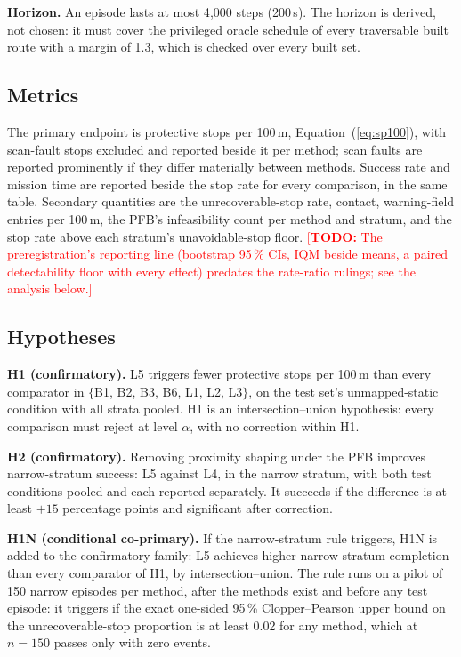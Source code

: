 \documentclass[sensors,article,submit,moreauthors]{Definitions/mdpi}
\newcommand{\todo}[1]{\textcolor{red}{[\textbf{TODO:} #1]}}
\begin{document}
\textbf{Horizon.} An episode lasts at most 4{,}000 steps (200\,s). The horizon is derived, not chosen: it must cover the privileged oracle schedule of every traversable built route with a margin of 1.3, which is checked over every built set.

\subsection{Metrics}\label{sec:metrics}

The primary endpoint is protective stops per 100\,m, Equation~(\ref{eq:sp100}), with scan-fault stops excluded and reported beside it per method; scan faults are reported prominently if they differ materially between methods. Success rate and mission time are reported beside the stop rate for every comparison, in the same table. Secondary quantities are the unrecoverable-stop rate, contact, warning-field entries per 100\,m, the PFB's infeasibility count per method and stratum, and the stop rate above each stratum's unavoidable-stop floor. \todo{The preregistration's reporting line (bootstrap 95\,\% CIs, IQM beside means, a paired detectability floor with every effect) predates the rate-ratio rulings; see the analysis below.}

\subsection{Hypotheses}\label{sec:hypotheses}

\textbf{H1 (confirmatory).} L5 triggers fewer protective stops per 100\,m than every comparator in $\{$B1, B2, B3, B6, L1, L2, L3$\}$, on the test set's unmapped-static condition with all strata pooled. H1 is an intersection--union hypothesis: every comparison must reject at level $\alpha$, with no correction within H1.

\textbf{H2 (confirmatory).} Removing proximity shaping under the PFB improves narrow-stratum success: L5 against L4, in the narrow stratum, with both test conditions pooled and each reported separately. It succeeds if the difference is at least $+15$ percentage points and significant after correction.

\textbf{H1N (conditional co-primary).} If the narrow-stratum rule triggers, H1N is added to the confirmatory family: L5 achieves higher narrow-stratum completion than every comparator of H1, by intersection--union. The rule runs on a pilot of 150 narrow episodes per method, after the methods exist and before any test episode: it triggers if the exact one-sided 95\,\% Clopper--Pearson upper bound on the unrecoverable-stop proportion is at least 0.02 for any method, which at $n = 150$ passes only with zero events.
\end{document}
